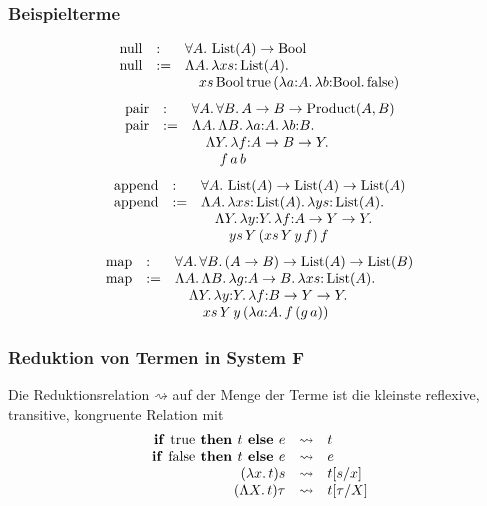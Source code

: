 \documentclass{beamer}
\newcommand{\defeq}{:=} %
\newcommand{\Bool}{\text{Bool}}
\newcommand{\trueV}{\text{true}}
\newcommand{\falseV}{\text{false}}
\newcommand{\fa}[1]{\forall {#1}.\,}
\newcommand{\lam}[1]{\lambda #1.\,}
\newcommand{\Lam}[1]{\Lambda #1.\,}
\newcommand{\reducesTo}{\mathbin{\rightsquigarrow}} %
\newcommand{\ite}[3]{\text{\textbf{if }} #1 \text{\textbf{ then }} #2 \text{\textbf{ else }} #3}
\DeclareMathOperator{\Product}{Product}
\DeclareMathOperator{\List}{List}
\begin{document}
\begin{frame}
  \frametitle{Beispielterme}
  \[\begin{array}{r l l}
    \text{null} &:& \fa{A} \List(A) \to \Bool \\
    \text{null} &\defeq& \Lam{A} \lam{xs{:}\List(A)} \\
    && \quad xs\,\Bool\,\trueV\,(\lam{a{:}A} \lam{b{:}\Bool} \falseV)
  \end{array}\]
  \[\begin{array}{r l l}
    \text{pair} &:& \fa{A} \fa{B} A \to B \to \Product(A, B) \\
    \text{pair} &\defeq& \Lam{A} \Lam{B} \lam{a{:}A} \lam{b{:}B} \\
    && \quad \Lam{Y} \lam{f{:}A \to B \to Y} \\
    && \quad\quad f\,a\,b
  \end{array}\]
  \[\begin{array}{r l l}
    \text{append} &:& \fa{A} \List(A) \to \List(A) \to \List(A) \\
    \text{append} &\defeq& \Lam{A} \lam{xs{:}\List(A)} \lam{ys{:}\List(A)} \\
    && \quad \Lam{Y} \lam{y{:}Y} \lam{f{:}A \to Y \to Y} \\
    && \quad\quad ys\,Y\,(xs\,Y\,y\,f)\,f
  \end{array}\]
  \[\begin{array}{r l l}
    \text{map} &:& \fa{A} \fa{B} (A \to B) \to \List(A) \to \List(B) \\
    \text{map} &\defeq& \Lam{A} \Lam{B} \lam{g{:}A \to B} \lam{xs{:}\List(A)} \\
    && \quad \Lam{Y} \lam{y{:}Y} \lam{f{:}B \to Y \to Y} \\
    && \quad\quad xs\,Y\,y\,(\lam{a{:}A} f\,(g\,a))
  \end{array}\]
\end{frame}

\begin{frame}
  \frametitle{Reduktion von Termen in System F}
  Die Reduktionsrelation $\reducesTo$ auf der Menge der Terme ist die kleinste reflexive, transitive, kongruente Relation mit
  \[\begin{array}{r c l}
    \ite{\trueV}{t}{e} &\reducesTo& t \\
    \ite{\falseV}{t}{e} &\reducesTo& e \\
    (\lam{x} t) s &\reducesTo& t[s/x] \\
    (\Lam{X} t) \tau &\reducesTo& t[\tau/X]
  \end{array}\]
\end{frame}
\end{document}
